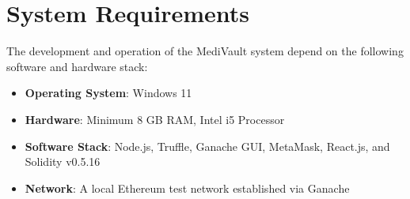 \section{System Requirements}
The development and operation of the MediVault system depend on the following software and hardware stack:
\begin{itemize}
    \item \textbf{Operating System}: Windows 11
    \item \textbf{Hardware}: Minimum 8 GB RAM, Intel i5 Processor
    \item \textbf{Software Stack}: Node.js, Truffle, Ganache GUI, MetaMask, React.js, and Solidity v0.5.16
    \item \textbf{Network}: A local Ethereum test network established via Ganache
\end{itemize}
